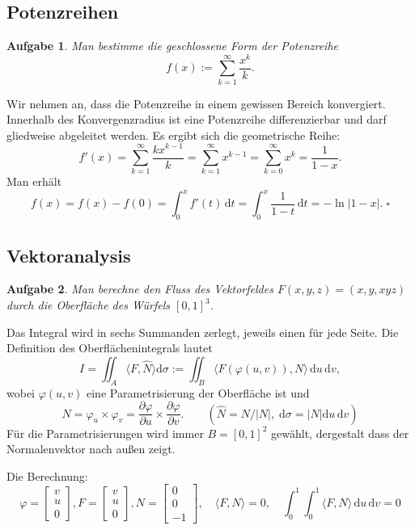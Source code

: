 \documentclass[a4paper,10pt,fleqn,twoside]{scrartcl}
\numberwithin{equation}{section}
\newcommand{\strong}[1]{{\normalfont\sffamily\bfseries #1}}
\renewcommand{\qedsymbol}{\ensuremath{\square}}
\theoremstyle{Aufgabe}
\newtheorem{Aufgabe}{\sffamily Aufgabe}[section]
\begin{document}
\subsection{Potenzreihen}
\begin{Aufgabe}
Man bestimme die geschlossene Form der Potenzreihe
\[f(x):=\sum_{k=1}^\infty\frac{x^k}{k}.\]
\end{Aufgabe}
Wir nehmen an, dass die Potenzreihe in einem gewissen Bereich
konvergiert. Innerhalb des Konvergenzradius ist eine
Potenzreihe differenzierbar und darf gliedweise abgeleitet
werden. Es ergibt sich die geometrische Reihe:
\begin{equation}
f'(x) = \sum_{k=1}^\infty \frac{kx^{k-1}}{k}
= \sum_{k=1}^\infty x^{k-1}
= \sum_{k=0}^\infty x^k
= \frac{1}{1-x}.
\end{equation}
Man erhält
\begin{equation}
f(x) = f(x)-f(0) = \int_0^x f'(t)\,\mathrm dt
= \int_0^x \frac{1}{1-t}\,\mathrm dt
= -\ln|1-x|.\;\qedsymbol
\end{equation}

\newpage
\subsection{Vektoranalysis}
\begin{Aufgabe}
Man berechne den Fluss des Vektorfeldes $F(x,y,z)=(x,y,xyz)$ durch
die Oberfläche des Würfels $[0,1]^3$.
\end{Aufgabe}

\noindent\strong{Lösung.}
Das Integral wird in sechs Summanden zerlegt, jeweils einen für jede
Seite. Die Definition des Oberflächenintegrals lautet
\begin{equation}
I = \iint_A \langle F,\hat N\rangle \mathrm d\sigma
:= \iint_B \langle F(\varphi(u,v)),N\rangle\,\mathrm du\,\mathrm dv,
\end{equation}
wobei $\varphi(u,v)$ eine Parametrisierung der Oberfläche ist und
\[N = \varphi_u\times\varphi_v = \frac{\partial\varphi}{\partial u}\times\frac{\partial\varphi}{\partial v}.
\qquad (\hat N = N/|N|,\;\mathrm d\sigma = |N|\mathrm du\,\mathrm dv)\]
Für die Parametrisierungen wird immer $B=[0,1]^2$ gewählt, dergestalt
dass der Normalenvektor nach außen zeigt.

\noindent
Die Berechnung:
\[
\varphi = \begin{bmatrix}v\\ u\\ 0\end{bmatrix},
F = \begin{bmatrix}v\\ u\\ 0\end{bmatrix},
N = \begin{bmatrix}0\\ 0\\ -1 \end{bmatrix},
\quad\langle F,N\rangle = 0,
\quad\int_0^1 \int_0^1 \langle F,N\rangle\,\mathrm du\,\mathrm dv = 0
\]
\end{document}
